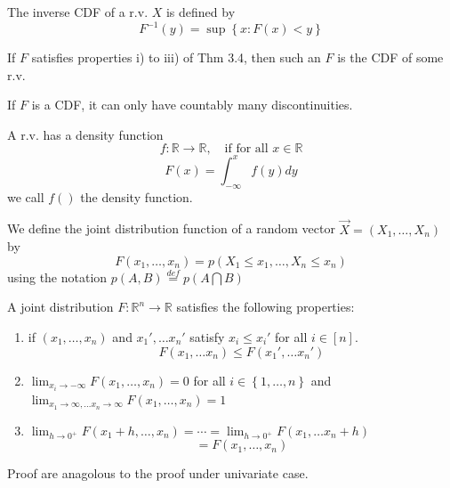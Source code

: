 \begin{definition}
    The inverse CDF of a r.v. $X$ is defined by
    \[F^{-1}(y) = \sup\left\{x:F(x) < y\right\}\]
\end{definition}

\begin{theorem}[][3.5.1]
    If $F$ satisfies properties i) to iii) of Thm 3.4, then such an $F$ is the CDF of some r.v. 
\end{theorem}

\begin{theorem}[][3.6]
    If $F$ is a CDF, it can only have countably many discontinuities.
\end{theorem}

\begin{definition}
    A r.v. has a density function
    \[f: \mathbb{R} \rightarrow \mathbb{R}, \quad \text{if for all }x \in \mathbb{R} \]
    \[F(x) = \int_{-\infty}^{x}f(y)dy\]
    we call $f()$ the density function.
\end{definition}

\begin{definition}
    We define the joint distribution function of a random vector $\overrightarrow{X} = (X_1, \dots, X_n)$ by
    \[F(x_1, \dots, x_n) = p(X_1 \leq x_1, \dots, X_n \leq x_n)\]
    using the notation $p(A, B) \overset{def}{=}p(A\bigcap B)$
\end{definition}

\begin{theorem}[][3.8.1]
    A joint distribution $F: \mathbb{R}^n \rightarrow \mathbb{R} $ satisfies the following properties:
    \begin{enumerate}[label = \roman*)]
        \item if $(x_1, \dots, x_n)$ and $x_1', \dots x_n'$ satisfy $x_i \leq x_i'$ for all $i \in [n]$.
        \[F(x_1, \dots x_n) \leq F(x_1', \dots x_n')\]
        \item $\lim_{x_i \to -\infty} F(x_1, \dots, x_n) = 0$ for all $i \in \left\{1, \dots, n\right\}$ and 
        $\lim_{x_1 \to \infty, \dots x_n \to \infty}  F (x_1, \dots, x_n) = 1$
        \item $\lim_{h \to 0^+}F(x_1+h, \dots, x_n) = \cdots = \lim_{h \to 0^+}F(x_1, \dots x_n+h)$
        \[=F(x_1, \dots, x_n)\]
    \end{enumerate}
    Proof are anagolous to the proof under univariate case.
\end{theorem}

